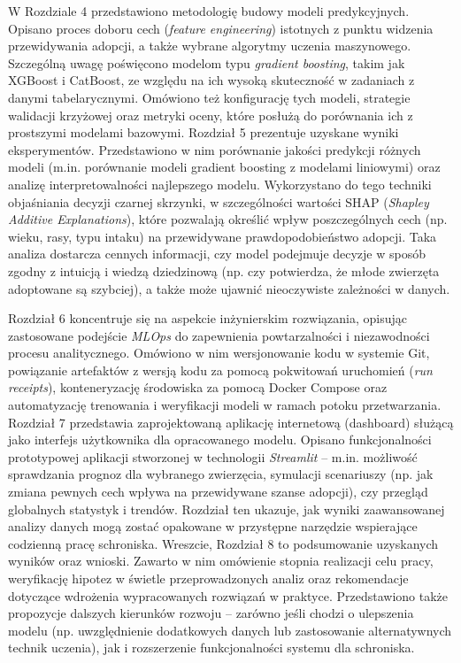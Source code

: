W Rozdziale 4 przedstawiono metodologię budowy modeli predykcyjnych. Opisano proces doboru cech (\emph{feature engineering}) istotnych z punktu widzenia przewidywania adopcji, a także wybrane algorytmy uczenia maszynowego. Szczególną uwagę poświęcono modelom typu \emph{gradient boosting}, takim jak XGBoost i CatBoost, ze względu na ich wysoką skuteczność w zadaniach z danymi tabelarycznymi. Omówiono też konfigurację tych modeli, strategie walidacji krzyżowej oraz metryki oceny, które posłużą do porównania ich z prostszymi modelami bazowymi. Rozdział 5 prezentuje uzyskane wyniki eksperymentów. Przedstawiono w nim porównanie jakości predykcji różnych modeli (m.in. porównanie modeli gradient boosting z modelami liniowymi) oraz analizę interpretowalności najlepszego modelu. Wykorzystano do tego techniki objaśniania decyzji czarnej skrzynki, w szczególności wartości SHAP (\emph{Shapley Additive Explanations}), które pozwalają określić wpływ poszczególnych cech (np. wieku, rasy, typu intaku) na przewidywane prawdopodobieństwo adopcji. Taka analiza dostarcza cennych informacji, czy model podejmuje decyzje w sposób zgodny z intuicją i wiedzą dziedzinową (np. czy potwierdza, że młode zwierzęta adoptowane są szybciej), a także może ujawnić nieoczywiste zależności w danych.

Rozdział 6 koncentruje się na aspekcie inżynierskim rozwiązania, opisując zastosowane podejście \emph{MLOps} do zapewnienia powtarzalności i niezawodności procesu analitycznego. Omówiono w nim wersjonowanie kodu w systemie Git, powiązanie artefaktów z wersją kodu za pomocą pokwitowań uruchomień (\emph{run receipts}), konteneryzację środowiska za pomocą Docker Compose oraz automatyzację trenowania i weryfikacji modeli w ramach potoku przetwarzania. Rozdział 7 przedstawia zaprojektowaną aplikację internetową (dashboard) służącą jako interfejs użytkownika dla opracowanego modelu. Opisano funkcjonalności prototypowej aplikacji stworzonej w technologii \emph{Streamlit} – m.in. możliwość sprawdzania prognoz dla wybranego zwierzęcia, symulacji scenariuszy (np. jak zmiana pewnych cech wpływa na przewidywane szanse adopcji), czy przegląd globalnych statystyk i trendów. Rozdział ten ukazuje, jak wyniki zaawansowanej analizy danych mogą zostać opakowane w przystępne narzędzie wspierające codzienną pracę schroniska. Wreszcie, Rozdział 8 to podsumowanie uzyskanych wyników oraz wnioski. Zawarto w nim omówienie stopnia realizacji celu pracy, weryfikację hipotez w świetle przeprowadzonych analiz oraz rekomendacje dotyczące wdrożenia wypracowanych rozwiązań w praktyce. Przedstawiono także propozycje dalszych kierunków rozwoju – zarówno jeśli chodzi o ulepszenia modelu (np. uwzględnienie dodatkowych danych lub zastosowanie alternatywnych technik uczenia), jak i rozszerzenie funkcjonalności systemu dla schroniska.

